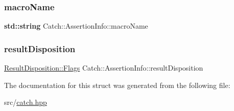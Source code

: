 \mbox{\label{struct_catch_1_1_assertion_info_ac2e59e8c89e00eb3390768f50d540b18}} 
\subsubsection{\texorpdfstring{macro\+Name}{macroName}}
{\footnotesize\ttfamily \textbf{ std\+::string} Catch\+::\+Assertion\+Info\+::macro\+Name}

\mbox{\label{struct_catch_1_1_assertion_info_a60353b3632ab2f827162f2b2d6911073}} 
\subsubsection{\texorpdfstring{result\+Disposition}{resultDisposition}}
{\footnotesize\ttfamily \hyperlink{struct_catch_1_1_result_disposition_a3396cad6e2259af326b3aae93e23e9d8}{Result\+Disposition\+::\+Flags} Catch\+::\+Assertion\+Info\+::result\+Disposition}



The documentation for this struct was generated from the following file\+:\begin{DoxyCompactItemize}
\item 
src/\hyperlink{catch_8hpp}{catch.\+hpp}\end{DoxyCompactItemize}
